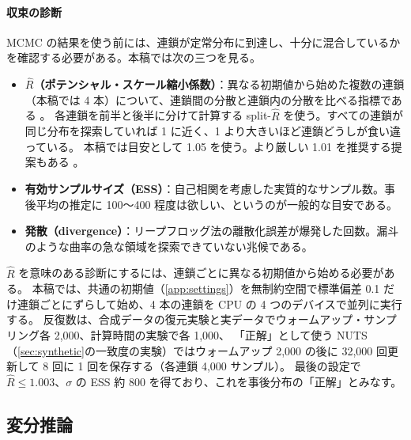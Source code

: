 \paragraph{収束の診断}
MCMC の結果を使う前には、連鎖が定常分布に到達し、十分に混合しているかを確認する必要がある。本稿では次の三つを見る。
\begin{itemize}
  \item \textbf{$\hat R$（ポテンシャル・スケール縮小係数）}：異なる初期値から始めた複数の連鎖（本稿では 4 本）について、連鎖間の分散と連鎖内の分散を比べる指標である \parencite{gelman1992}。
    各連鎖を前半と後半に分けて計算する split-$\hat R$ \parencite{gelman2013} を使う。すべての連鎖が同じ分布を探索していれば 1 に近く、1 より大きいほど連鎖どうしが食い違っている。
    本稿では目安として 1.05 を使う。より厳しい 1.01 を推奨する提案もある \parencite{vehtari2021}。
  \item \textbf{有効サンプルサイズ（ESS）}：自己相関を考慮した実質的なサンプル数。事後平均の推定に 100〜400 程度は欲しい、というのが一般的な目安である。
  \item \textbf{発散（divergence）}：リープフロッグ法の離散化誤差が爆発した回数。漏斗のような曲率の急な領域を探索できていない兆候である。
\end{itemize}
$\hat R$ を意味のある診断にするには、連鎖ごとに異なる初期値から始める必要がある。
本稿では、共通の初期値（\cref{app:settings}）を無制約空間で標準偏差 0.1 だけ連鎖ごとにずらして始め、4 本の連鎖を CPU の 4 つのデバイスで並列に実行する。
反復数は、合成データの復元実験と実データでウォームアップ・サンプリング各 2,000、計算時間の実験で各 1,000、
「正解」として使う NUTS（\cref{sec:synthetic}の一致度の実験）ではウォームアップ 2,000 の後に 32,000 回更新して 8 回に 1 回を保存する（各連鎖 4,000 サンプル）。
最後の設定で $\hat R \leq 1.003$、$\sigma$ の ESS 約 800 を得ており、これを事後分布の「正解」とみなす。

\subsection{変分推論}\label{sec:inf-vi}

